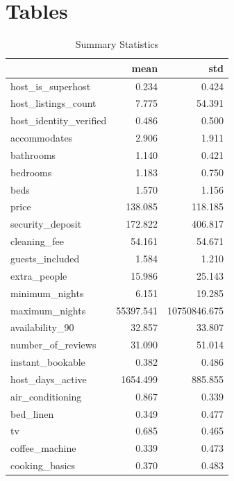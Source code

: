 \section{Tables}
\begin{table}[H]
    \centering
    \caption{Summary Statistics}
    \label{tab:descriptive-statistic}
{\small

\begin{tabular}{lrr}
\toprule
{} &      mean &          std \\
\midrule
host\_is\_superhost      &     0.234 &        0.424 \\
host\_listings\_count    &     7.775 &       54.391 \\
host\_identity\_verified &     0.486 &        0.500 \\
accommodates           &     2.906 &        1.911 \\
bathrooms              &     1.140 &        0.421 \\
bedrooms               &     1.183 &        0.750 \\
beds                   &     1.570 &        1.156 \\
price                  &   138.085 &      118.185 \\
security\_deposit       &   172.822 &      406.817 \\
cleaning\_fee           &    54.161 &       54.671 \\
guests\_included        &     1.584 &        1.210 \\
extra\_people           &    15.986 &       25.143 \\
minimum\_nights         &     6.151 &       19.285 \\
maximum\_nights         & 55397.541 & 10750846.675 \\
availability\_90        &    32.857 &       33.807 \\
number\_of\_reviews      &    31.090 &       51.014 \\
instant\_bookable       &     0.382 &        0.486 \\
host\_days\_active       &  1654.499 &      885.855 \\
air\_conditioning       &     0.867 &        0.339 \\
bed\_linen              &     0.349 &        0.477 \\
tv                     &     0.685 &        0.465 \\
coffee\_machine         &     0.339 &        0.473 \\
cooking\_basics         &     0.370 &        0.483 \\

\end{tabular}}
\end{table}
